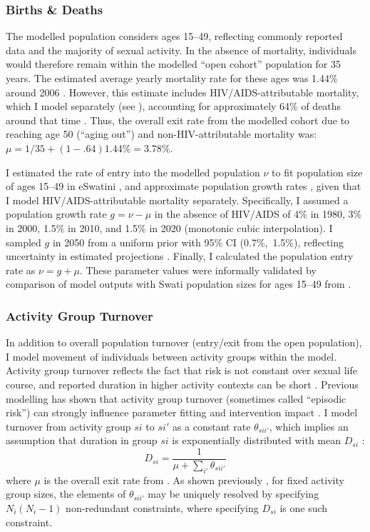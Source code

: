 \subsubsection{Births \& Deaths}\label{model.par.turnover.bd}
The modelled population considers ages 15--49,
reflecting commonly reported data and the majority of sexual activity.
In the absence of mortality, individuals would therefore
remain within the modelled ``open cohort'' population for 35 years.
The estimated average yearly mortality rate for these ages was 1.44\% around 2006
\cite[Table~15.2]{SDHS2006}.
However, this estimate includes HIV/AIDS-attributable mortality,
which I model separately (see ),
accounting for approximately 64\% of deaths around that time \cite{WHO2006EswMort}.
Thus, the overall exit rate from the modelled cohort
due to reaching age 50 (``aging out'') and non-HIV-attributable mortality was:
$\mu = 1/35 + (1-.64) 1.44\% = 3.78\%$.
\par
I estimated the rate of entry into the modelled population $\nu$
to fit population size of ages 15--49 in eSwatini \cite{WorldBank},
and approximate population growth rates \cite{UNWPP2019},
given that I model HIV/AIDS-attributable mortality separately.
Specifically, I assumed a population growth rate $g = \nu - \mu$ in the absence of HIV/AIDS of
4\% in 1980, 3\% in 2000, 1.5\% in 2010, and 1.5\% in 2020 (monotonic cubic interpolation).
I sampled $g$ in 2050 from a uniform prior with 95\% CI (0.7\%,~1.5\%),
reflecting uncertainty in estimated projections \cite{UNWPP2019}.
Finally, I calculated the population entry rate as $\nu = g + \mu$.
These parameter values were informally validated by comparison of model outputs with
Swati population sizes for ages 15--49 from \cite{WorldBank}.
\subsubsection{Activity Group Turnover}\label{model.par.turnover.act}
In addition to overall population turnover (entry/exit from the open population),
I model movement of individuals between activity groups within the model.
Activity group turnover reflects the fact that risk is not constant over sexual life course,
and reported duration in higher activity contexts can be short \cite{Scorgie2012}.
Previous modelling has shown that activity group turnover (sometimes called ``episodic risk'')
can strongly influence parameter fitting and intervention impact \cite{Henry2015,Knight2020}.
I model turnover from activity group $si$ to $si'$ as a constant rate $\theta_{sii'}$,
which implies an assumption that duration in group $si$ is
exponentially distributed with mean $D_{si}$ \cite{Roberts2015}:
\begin{equation}\label{eq:model.par.dur}
  D_{si} = \frac{1}{\mu + \sum_{i'}\theta_{sii'}}
\end{equation}
where $\mu$ is the overall exit rate from .
As shown previously \cite{Knight2020}, for fixed activity group sizes,
the elements of $\theta_{sii'}$ may be uniquely resolved by
specifying $N_{i}(N_{i}-1)$ non-redundant constraints,
where specifying $D_{si}$ is one such constraint.

